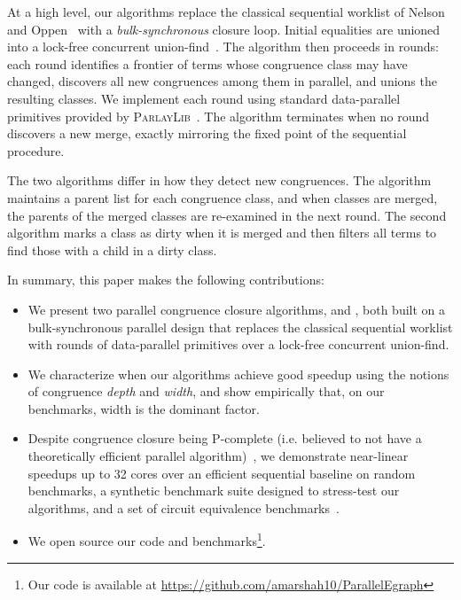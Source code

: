At a high level, our algorithms replace the classical sequential worklist of
Nelson and Oppen~\cite{nelson-oppen-cc} with a \emph{bulk-synchronous} closure
loop. Initial equalities are unioned into a lock-free concurrent
union-find~\cite{uf}. The algorithm then proceeds in rounds: each round
identifies a frontier of terms whose congruence class may have changed,
discovers all new congruences among them in parallel, and unions the resulting
classes. We implement each round using standard data-parallel primitives
provided by \textsc{ParlayLib}~\cite{parlaylib}. The algorithm terminates
when no round discovers a new merge, exactly mirroring the fixed point of
the sequential procedure.

The two algorithms differ in how they detect new congruences. The algorithm
\parentalgo maintains a parent list for each congruence class, and when
classes are merged, the parents of the merged classes are re-examined in the
next round. The second algorithm \filteralgo marks a class as dirty when it
is merged and then filters all terms to find those with a child in a dirty
class.

 
In summary, this paper makes the following contributions:

\begin{itemize}
    \item We present two parallel congruence closure algorithms, \parentalgo
    and \filteralgo, both built on a bulk-synchronous parallel design that
    replaces the classical sequential worklist with rounds of data-parallel
    primitives over a lock-free concurrent union-find.
    \item We characterize when our algorithms achieve good speedup using the
    notions of congruence \emph{depth} and \emph{width}, and show empirically
    that, on our benchmarks, width is the dominant factor.
    \item Despite congruence closure being \textsc{P}-complete (i.e. believed to not
    have a theoretically efficient parallel
    algorithm)~\cite{unification}, we demonstrate near-linear speedups up to
    32 cores over an efficient
    sequential baseline on random benchmarks, a synthetic benchmark suite
    designed to stress-test our algorithms, and a set of circuit equivalence
    benchmarks~\cite{clausal-cc}.
    \item We open source our code and benchmarks\footnote{Our code is available at \url{https://github.com/amarshah10/ParallelEgraph}}.
\end{itemize}
